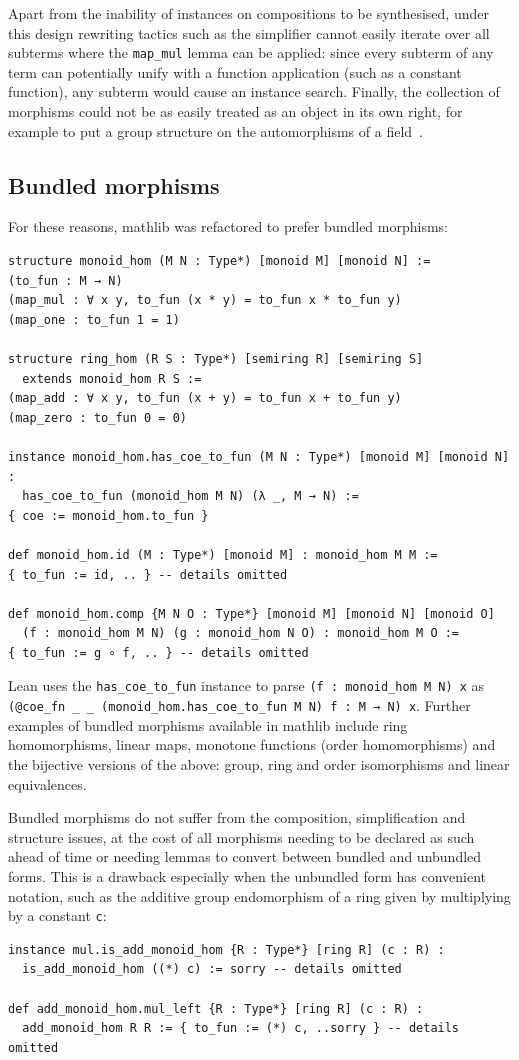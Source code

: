 \documentclass[a4paper,UKenglish,cleveref, autoref, thm-restate]{lipics-v2021}
\newcommand{\mathlib}{\textsf{mathlib}\xspace}
\begin{document}
Apart from the inability of instances on compositions to be synthesised,
under this design rewriting tactics such as the simplifier cannot easily iterate over all subterms where the \lstinline{map_mul} lemma can be applied:
since every subterm of any term can potentially unify with a function application (such as a constant function),
any subterm would cause an instance search.
Finally, the collection of morphisms could not be as easily treated as an object in its own right,
for example to put a group structure on the automorphisms of a field~\cite{mathlib}.

\subsection{Bundled morphisms}
For these reasons, \mathlib was refactored to prefer bundled morphisms:
\begin{lstlisting}
structure monoid_hom (M N : Type*) [monoid M] [monoid N] :=
(to_fun : M → N)
(map_mul : ∀ x y, to_fun (x * y) = to_fun x * to_fun y)
(map_one : to_fun 1 = 1)

structure ring_hom (R S : Type*) [semiring R] [semiring S]
  extends monoid_hom R S :=
(map_add : ∀ x y, to_fun (x + y) = to_fun x + to_fun y)
(map_zero : to_fun 0 = 0)

instance monoid_hom.has_coe_to_fun (M N : Type*) [monoid M] [monoid N] :
  has_coe_to_fun (monoid_hom M N) (λ _, M → N) :=
{ coe := monoid_hom.to_fun }

def monoid_hom.id (M : Type*) [monoid M] : monoid_hom M M :=
{ to_fun := id, .. } -- details omitted

def monoid_hom.comp {M N O : Type*} [monoid M] [monoid N] [monoid O]
  (f : monoid_hom M N) (g : monoid_hom N O) : monoid_hom M O :=
{ to_fun := g ∘ f, .. } -- details omitted
\end{lstlisting}
Lean uses the \lstinline{has_coe_to_fun} instance to parse \lstinline{(f : monoid_hom M N) x} as \lstinline{(@coe_fn _ _ (monoid_hom.has_coe_to_fun M N) f : M → N) x}.
Further examples of bundled morphisms available in \mathlib include ring homomorphisms, linear maps, monotone functions (order homomorphisms)
and the bijective versions of the above: group, ring and order isomorphisms and linear equivalences.

Bundled morphisms do not suffer from the composition, simplification and structure issues,
at the cost of all morphisms needing to be declared as such ahead of time or needing lemmas to convert between bundled and unbundled forms.
This is a drawback especially when the unbundled form has convenient notation,
such as the additive group endomorphism of a ring given by multiplying by a constant \lstinline{c}:
\begin{lstlisting}
instance mul.is_add_monoid_hom {R : Type*} [ring R] (c : R) :
  is_add_monoid_hom ((*) c) := sorry -- details omitted

def add_monoid_hom.mul_left {R : Type*} [ring R] (c : R) :
  add_monoid_hom R R := { to_fun := (*) c, ..sorry } -- details omitted
\end{lstlisting}
\end{document}
